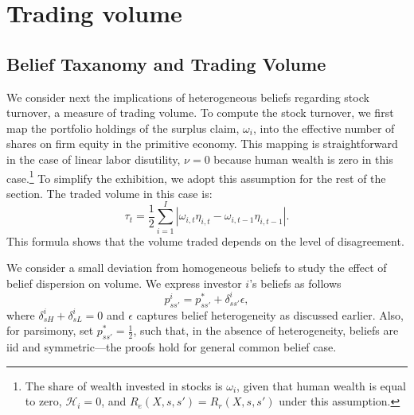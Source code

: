 \section{Trading volume}\label{app:volume}

\subsection{Belief Taxanomy and Trading Volume}

We consider next the implications of heterogeneous beliefs regarding stock turnover, a measure of trading volume. To compute the stock turnover, we first map the portfolio holdings of the surplus claim, $\omega_i$, into the effective number of shares on firm equity in the primitive economy. This mapping is straightforward in the case of linear labor disutility, $\nu = 0$ because human wealth is zero in this case.\footnote{The share of wealth invested in stocks is $\omega_i$, given that human wealth is equal to zero, $\mathcal{H}_i = 0$, and $R_{e}(X,s,s') = R_{r}(X,s,s')$ under this assumption.} To simplify the exhibition, we adopt this assumption for the rest of the section. The traded volume in this case is:
\begin{equation}
    \tau_t = \frac{1}{2} \sum_{i=1}^I |\omega_{i,t} \eta_{i,t} - \omega_{i,t-1} \eta_{i,t-1} |.\nonumber
\end{equation} 
This formula shows that the volume traded depends on the level of disagreement. 

We consider a small deviation from homogeneous beliefs to study the effect of belief dispersion on volume. We express investor $i$'s beliefs as follows
\begin{equation}
    p_{ss'}^i = p_{ss'}^* + \delta_{ss'}^i \epsilon,\nonumber
\end{equation}
where $\delta_{sH}^i + \delta_{sL}^i = 0$ and $\epsilon$ captures belief heterogeneity as discussed earlier. Also, for parsimony, set $p_{ss'}^* = \frac{1}{2}$, such that, in the absence of heterogeneity, beliefs are iid and symmetric---the proofs hold for general common belief case.

